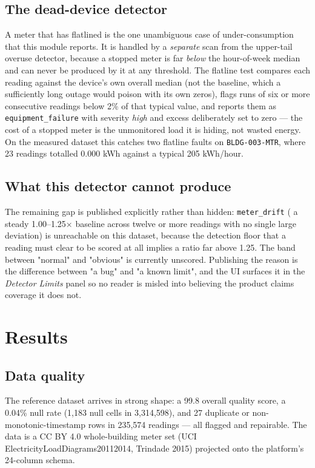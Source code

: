 \documentclass[conference, 10pt, a4paper]{IEEEtran}
\begin{document}
\subsection{The dead-device detector}
A meter that has flatlined is the one unambiguous case of under-consumption
that this module reports. It is handled by a \emph{separate} scan from the
upper-tail overuse detector, because a stopped meter is far \emph{below} the
hour-of-week median and can never be produced by it at any threshold. The
flatline test compares each reading against the device's own overall median
(not the baseline, which a sufficiently long outage would poison with its own
zeros), flags runs of six or more consecutive readings below 2\% of that
typical value, and reports them as \texttt{equipment\_failure} with severity
\emph{high} and excess deliberately set to zero — the cost of a stopped meter
is the unmonitored load it is hiding, not wasted energy. On the measured
dataset this catches two flatline faults on \texttt{BLDG-003-MTR}, where 23
readings totalled 0.000 kWh against a typical 205 kWh/hour.

\subsection{What this detector cannot produce}
The remaining gap is published explicitly rather than hidden: \texttt{meter\_drift}
( a steady 1.00--1.25$\times$ baseline across twelve or more readings with no
single large deviation) is unreachable on this dataset, because the detection
floor that a reading must clear to be scored at all implies a ratio far above
1.25. The band between "normal" and "obvious" is currently unscored. Publishing
the reason is the difference between "a bug" and "a known limit", and the UI
surfaces it in the \emph{Detector Limits} panel so no reader is misled into
believing the product claims coverage it does not.

\section{Results}

\subsection{Data quality}
The reference dataset arrives in strong shape: a 99.8 overall quality score, a
0.04\% null rate (1,183 null cells in 3,314,598), and 27 duplicate or
non-monotonic-timestamp rows in 235,574 readings — all flagged and repairable.
The data is a CC BY 4.0 whole-building meter set (UCI
ElectricityLoadDiagrams20112014, Trindade 2015) projected onto the platform's
24-column schema.
\end{document}
